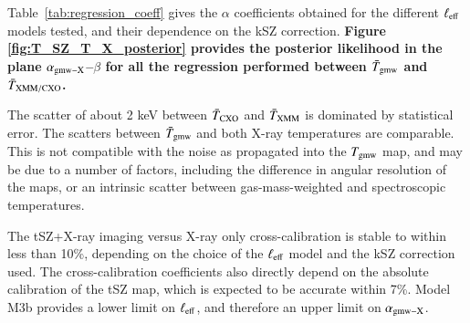 \documentclass[twocolumn,traditabstract]{aa}
\begin{document}
Table~\ref{tab:regression_coeff} gives the $\alpha $ coefficients obtained for the different $\ell_{\rm eff}$ models tested, and their dependence on the kSZ correction. {\bf Figure \ref{fig:T_SZ_T_X_posterior} provides the posterior likelihood in the plane $\alpha_{\rm gmw-X}$--$\beta$ for all the regression performed between $\bar{T}_{\rm gmw}$ and $\bar{T}_{\rm XMM/CXO}$.}

The scatter of about 2 keV between $\bar{T}_{\rm CXO}$ and $\bar{T}_{\rm XMM}$ is dominated by statistical error. The scatters between $\bar{T}_{\rm gmw}$ and both X-ray temperatures are comparable. This is not compatible with the noise as propagated into the $T_{\rm gmw}$ map, and may be due to a number of factors, including the difference in angular resolution of the maps, or an intrinsic scatter between gas-mass-weighted and spectroscopic temperatures.

The tSZ+X-ray imaging versus X-ray only cross-calibration is stable to within less than 10\%, depending on the choice of the $\ell_{\rm eff}$ model and the kSZ correction used. The cross-calibration coefficients also directly depend on the absolute calibration of the tSZ map, which is expected to be accurate within 7\%. Model M3b provides a lower limit on $\ell_{\rm eff}$, and therefore an upper limit on $\alpha_{\rm gmw-X}$.
\end{document}
